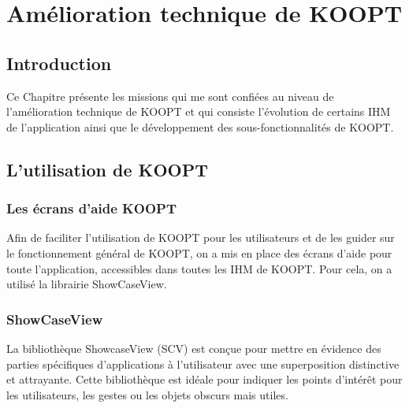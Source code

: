 \chapter{Amélioration technique de KOOPT}
\label{sec:Amélioration technique de KOOPT}

\section*{Introduction}


Ce Chapitre présente les missions qui me sont confiées au niveau de l’amélioration technique de KOOPT et qui consiste l'évolution de certains IHM de l’application ainsi que le développement des sous-fonctionnalités de KOOPT.


\section{L’utilisation de KOOPT}

\subsection{Les écrans d’aide KOOPT}
Afin de faciliter l’utilisation de KOOPT pour les utilisateurs et de les guider sur le fonctionnement général de KOOPT, on a mis en place des écrans d’aide pour toute l’application, accessibles dans toutes les IHM de KOOPT.
Pour cela, on a utilisé la librairie ShowCaseView.

\subsection{ShowCaseView}
La bibliothèque ShowcaseView (SCV) est conçue pour mettre en évidence des parties spécifiques d'applications à l'utilisateur avec une superposition distinctive et attrayante. Cette bibliothèque est idéale pour indiquer les points d'intérêt pour les utilisateurs, les gestes ou les objets obscurs mais utiles.


